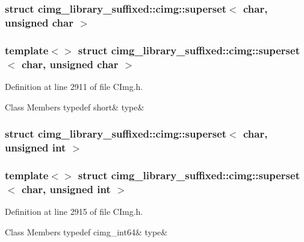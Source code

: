 \subsubsection{struct cimg\+\_\+library\+\_\+suffixed\+:\+:cimg\+:\+:superset$<$ char, unsigned char $>$}
\subsubsection*{template$<$$>$\newline
struct cimg\+\_\+library\+\_\+suffixed\+::cimg\+::superset$<$ char, unsigned char $>$}



Definition at line 2911 of file C\+Img.\+h.

\begin{DoxyFields}{Class Members}
\mbox{\label{namespacecimg__library__suffixed_1_1cimg_af7d4c67bd87f51e6f1b2673b33e43329}} 
typedef short&
type&
\\
\hline

\end{DoxyFields}
\label{structcimg__library__suffixed_1_1cimg_1_1superset_3_01char_00_01unsigned_01int_01_4}
\subsubsection{struct cimg\+\_\+library\+\_\+suffixed\+:\+:cimg\+:\+:superset$<$ char, unsigned int $>$}
\subsubsection*{template$<$$>$\newline
struct cimg\+\_\+library\+\_\+suffixed\+::cimg\+::superset$<$ char, unsigned int $>$}



Definition at line 2915 of file C\+Img.\+h.

\begin{DoxyFields}{Class Members}
\mbox{\label{namespacecimg__library__suffixed_1_1cimg_ae11e313b11f824c6cdad3e9c157c82bd}} 
typedef cimg\_int64&
type&
\\
\hline

\end{DoxyFields}
\label{structcimg__library__suffixed_1_1cimg_1_1superset_3_01char_00_01unsigned_01short_01_4}

